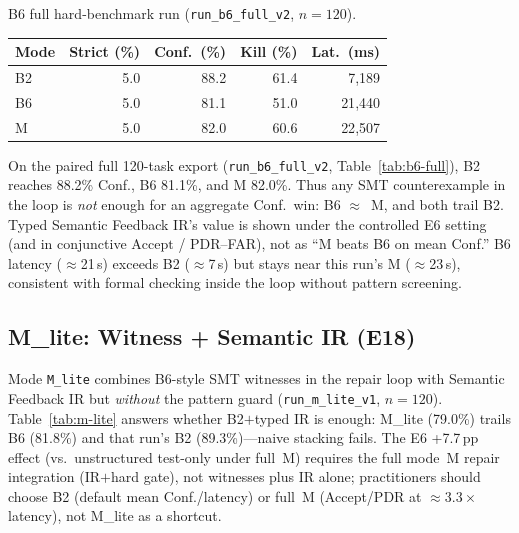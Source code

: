 \begin{inlinetable}{B6 full hard-benchmark run (\texttt{run\_b6\_full\_v2}, $n{=}120$).}
  \label{tab:b6-full}
  \footnotesize
  \begin{tabular}{lrrrr}
    \toprule
    Mode & Strict (\%) & Conf.\ (\%) & Kill (\%) & Lat.\ (ms) \\
    \midrule
    B2 & 5.0 & 88.2 & 61.4 & 7{,}189 \\
    B6 & 5.0 & 81.1 & 51.0 & 21{,}440 \\
    M  & 5.0 & 82.0 & 60.6 & 22{,}507 \\
    \bottomrule
  \end{tabular}
\end{inlinetable}

On the paired full 120-task export (\texttt{run\_b6\_full\_v2},
Table~\ref{tab:b6-full}), B2 reaches 88.2\% Conf., B6 81.1\%, and M 82.0\%.
Thus any SMT counterexample in the loop is \emph{not} enough for an aggregate
Conf.\ win: B6 ${\approx}$~M, and both trail B2.
Typed Semantic Feedback IR's value is shown under the controlled E6 setting
(and in conjunctive $\mathrm{Accept}$ / PDR--FAR), not as ``M beats B6 on mean
Conf.''
B6 latency ($\approx$21\,s) exceeds B2 ($\approx$7\,s) but stays near this run's M
($\approx$23\,s), consistent with formal checking inside the loop without
pattern screening.

\subsection{M\_lite: Witness + Semantic IR (E18)}
\label{sec:results:m-lite}

Mode \texttt{M\_lite} combines B6-style SMT witnesses in the repair loop with
Semantic Feedback IR but \emph{without} the pattern guard
(\texttt{run\_m\_lite\_v1}, $n{=}120$).
Table~\ref{tab:m-lite} answers whether B2$+$typed IR is enough: M\_lite
(79.0\%) trails B6 (81.8\%) and that run's B2 (89.3\%)---naive stacking fails.
The E6 +7.7\,pp effect (vs.\ unstructured test-only under full~M) requires the
full mode~M repair integration (IR$+$hard gate), not witnesses plus IR alone;
practitioners should choose B2 (default mean Conf./latency) or full~M
(Accept/PDR at ${\approx}3.3\times$ latency), not M\_lite as a shortcut.

